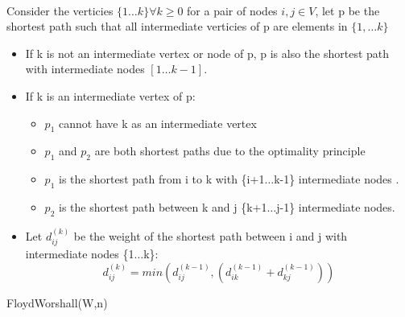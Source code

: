 \documentclass[12pt,letterpaper]{article}
\begin{document}
\paragraph{ }Consider the verticies $\{1\dots k\} \forall k \geq 0$ for a pair of nodes $i,j\in V$, let p be the shortest path such that all intermediate verticies of p are elements in $\{1,\dots k\}$
\begin{itemize}
\item If k is not an intermediate vertex or node of p, p is also the shortest path with intermediate nodes $[1\dots k-1]$.
\item If k is an intermediate vertex of p:
\begin{itemize}
\item $p_1$ cannot have k as an intermediate vertex
\item $p_1$ and $p_2$ are both shortest paths due to the optimality principle 
\item $p_1$ is the shortest path from i to k with \{i+1$\dots$k-1\} intermediate nodes .
\item $p_2$ is the shortest path between k and j \{k+1$\dots$j-1\} intermediate nodes.  

\end{itemize} 
\item Let $d_{ij}^{(k)}$ be the weight of the shortest path between i and j with intermediate nodes \{1$\dots$k\}:
\[d_{ij}^{(k)}=min\left(d_{ij}^{(k-1)},(d_{ik}^{(k-1)}+d_{kj}^{(k-1)})\right)\]
\end{itemize}
\begin{algorithm}[h]
FloydWorshall(W,n)
\end{algorithm}
\FloatBarrier
\end{document}
